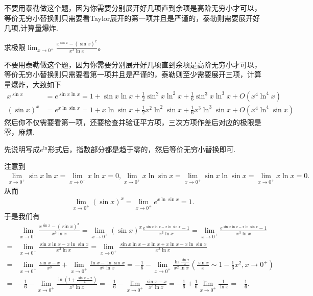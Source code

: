 \documentclass[../../main.tex]{subfiles}
\begin{document}
\begin{remark}
不要用泰勒做这个题，因为你需要分别展开好几项直到余项是高阶无穷小才可以，等价无穷小替换则只需要看Taylor展开的第一项并且是严谨的，泰勒则需要展开好几项,计算量爆炸.  
\end{remark}
\begin{example}
求极限\(\lim_{x\rightarrow0^{+}}\frac{x^{\sin x}-(\sin x)^{x}}{x^{3}\ln x}\)。
\end{example}
\begin{remark}
不要用泰勒做这个题，因为你需要分别展开好几项直到余项是高阶无穷小才可以，等价无穷小替换则只需要看第一项并且是严谨的，泰勒则至少需要展开三项，计算量爆炸，大致如下
\begin{align*}
x^{\sin x}&=e^{\sin x\ln x}=1+\sin x\ln x+\frac{1}{2}\sin^{2}x\ln^{2}x+\frac{1}{6}\sin^{3}x\ln^{3}x+O(x^{4}\ln^{4}x)\\
(\sin x)^{x}&=e^{x\ln\sin x}=1 + x\ln\sin x+\frac{1}{2}x^{2}\ln^{2}\sin x+\frac{1}{6}x^{3}\ln^{3}\sin x+O(x^{4}\ln^{4}\sin x)
\end{align*}
然后你不仅需要看第一项，还要检查并验证平方项，三次方项作差后对应的极限是零，麻烦. 
\end{remark}
\begin{note}
先说明写成\(e^{\ln}\)形式后，指数部分都是趋于零的，然后等价无穷小替换即可.
\end{note}
\begin{solution}
注意到\begin{align*}
\lim_{x\rightarrow0^{+}}\sin x\ln x=\lim_{x\rightarrow0^{+}}x\ln x = 0, \lim_{x\rightarrow0^{+}}x\ln\sin x=\lim_{x\rightarrow0^{+}}\sin x\ln\sin x=\lim_{x\rightarrow0^{+}}x\ln x = 0.
\end{align*}
从而
\begin{align*}
\lim_{x\rightarrow 0^+} (\sin x)^x=\lim_{x\rightarrow 0^+} e^{x\ln\sin x}=1.
\end{align*}
于是我们有
\begin{align*}
&\lim_{x\rightarrow0^{+}}\frac{x^{\sin x}-(\sin x)^{x}}{x^{3}\ln x}=\lim_{x\rightarrow0^{+}}(\sin x)^{x}\frac{e^{\sin x\ln x - x\ln\sin x}-1}{x^{3}\ln x}=\lim_{x\rightarrow0^{+}}\frac{e^{\sin x\ln x - x\ln\sin x}-1}{x^{3}\ln x}\\
=&\lim_{x\rightarrow0^{+}}\frac{\sin x\ln x - x\ln\sin x}{x^{3}\ln x}=\lim_{x\rightarrow0^{+}}\frac{\sin x\ln x - x\ln x + x\ln x - x\ln\sin x}{x^{3}\ln x}\\
=&\lim_{x\rightarrow0^{+}}\frac{\sin x - x}{x^{3}}+\lim_{x\rightarrow0^{+}}\frac{\ln x - \ln\sin x}{x^{2}\ln x}=-\frac{1}{6}-\lim_{x\rightarrow0^{+}}\frac{\ln\frac{\sin x}{x}}{x^{2}\ln x}(\frac{\sin x}{x}\sim1 - \frac{1}{6}x^{2},x\to 0^+)\\
=&-\frac{1}{6}-\lim_{x\rightarrow0^{+}}\frac{\ln(1 + \frac{\sin x - x}{x})}{x^{2}\ln x}=-\frac{1}{6}-\lim_{x\rightarrow0^{+}}\frac{\sin x - x}{x^{3}\ln x}=-\frac{1}{6}+\frac{1}{6}\lim_{x\rightarrow0^{+}}\frac{1}{\ln x}=-\frac{1}{6}.
\end{align*}
\end{solution}
\end{document}
